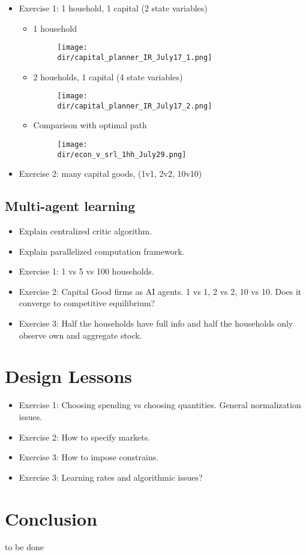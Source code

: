\documentclass[11pt,english]{article}
\begin{document}
\begin{itemize}
	\item Exercise 1: 1 houehold, 1 capital (2 state variables)
	
	\begin{itemize}
		\item 1 household
		
			\begin{figure}
			\centering\texttt{[image: \\dir/capital\_planner\_IR\_July17\_1.png]}
		\end{figure}
	
		\item 2 houeholds, 1 capital (4 state variables)
		
					\begin{figure}
			\centering\texttt{[image: \\dir/capital\_planner\_IR\_July17\_2.png]}
		\end{figure}
	
			\item Comparison with optimal path
	
	\begin{figure}
		\centering\texttt{[image: \\dir/econ\_v\_srl\_1hh\_July29.png]}
	\end{figure}
	
		
		
	\end{itemize}


	\item Exercise 2: many capital goods, (1v1, 2v2, 10v10)
\end{itemize}

\subsection{Multi-agent learning}
\begin{itemize}
	\item Explain centralized critic algorithm.
	\item Explain parallelized computation framework.
	\item Exercise 1: 1 vs 5 vs 100 households.
	\item Exercise 2: Capital Good firms as AI agents. 1 vs 1, 2 vs 2, 10 vs 10. Does it converge to competitive equilibrium?	
	\item Exercise 3: Half the households have full info and half the households only observe own and aggregate stock.
\end{itemize}


\section{Design Lessons}
\begin{itemize}
	\item Exercise 1: Choosing spending vs choosing quantities. General normalization issues.
	\item Exercise 2: How to specify markets.
	\item Exercise 3: How to impose constrains.
	\item Exercise 3: Learning rates and algorithmic issues?
\end{itemize}

\section{Conclusion}

to be done




\end{document}
